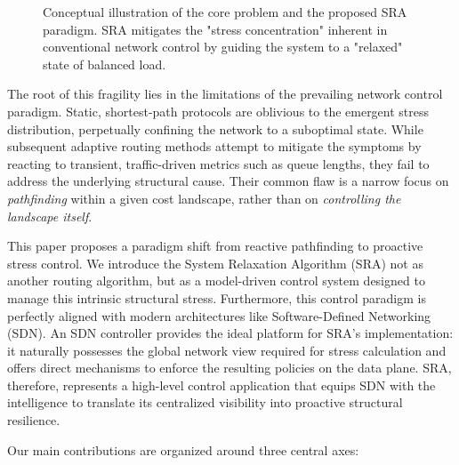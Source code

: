 \documentclass[journal]{IEEEtran}
\begin{document}
\begin{figure}[t!]
    \caption{Conceptual illustration of the core problem and the proposed SRA paradigm. SRA mitigates the "stress concentration" inherent in conventional network control by guiding the system to a "relaxed" state of balanced load.}
    \label{fig:intro_scenario}
\end{figure}

The root of this fragility lies in the limitations of the prevailing network control paradigm. Static, shortest-path protocols are oblivious to the emergent stress distribution, perpetually confining the network to a suboptimal state. While subsequent adaptive routing methods attempt to mitigate the symptoms by reacting to transient, traffic-driven metrics such as queue lengths, they fail to address the underlying structural cause. Their common flaw is a narrow focus on \textit{pathfinding} within a given cost landscape, rather than on \textit{controlling the landscape itself}.

This paper proposes a paradigm shift from reactive pathfinding to proactive stress control. We introduce the System Relaxation Algorithm (SRA) not as another routing algorithm, but as a model-driven control system designed to manage this intrinsic structural stress. Furthermore, this control paradigm is perfectly aligned with modern architectures like Software-Defined Networking (SDN). An SDN controller provides the ideal platform for SRA's implementation: it naturally possesses the global network view required for stress calculation and offers direct mechanisms to enforce the resulting policies on the data plane. SRA, therefore, represents a high-level control application that equips SDN with the intelligence to translate its centralized visibility into proactive structural resilience.

Our main contributions are organized around three central axes:
\end{document}
